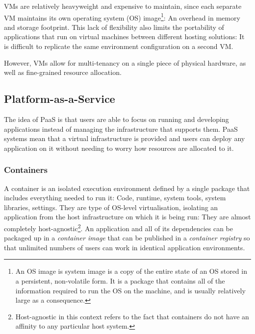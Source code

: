 VMs are relatively heavyweight and expensive to maintain, since each separate VM maintains its own operating system (OS) image\footnote{An OS image is system image is a copy of the entire state of an OS stored in a persistent, non-volatile form. It is a package that contains all of the information required to run the OS on the machine, and is usually relatively large as a consequence.}: An overhead in memory and storage footprint. This lack of flexibility also limits the portability of applications that run on virtual machines between different hosting solutions: It is difficult to replicate the same environment configuration on a second VM.

However, VMs allow for multi-tenancy on a single piece of physical hardware, as well as fine-grained resource allocation. 

\subsection{Platform-as-a-Service}
The idea of PaaS is that users are able to focus on running and developing applications instead of managing the infrastructure that supports them. PaaS systems mean that a virtual infrastructure is provided and users can deploy any application on it without needing to worry how resources are allocated to it.


\subsubsection{Containers}
A container is an isolated execution environment defined by a single package that includes everything needed to run it: Code, runtime, system tools, system libraries, settings. They are type of OS-level virtualisation, isolating an application from the host infrastructure on which it is being run: They are almost completely host-agnostic\footnote{Host-agnostic in this context refers to the fact that containers do not have an affinity to any particular host system.}. An application and all of its dependencies can be packaged up in a \textit{container image} that can be published in a \textit{container registry} so that unlimited numbers of users can work in identical application environments.

